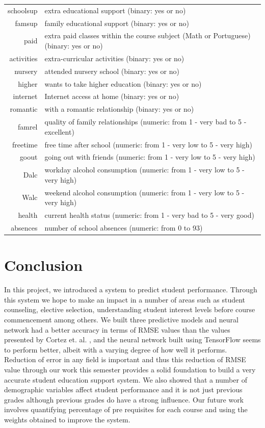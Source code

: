 \documentclass[conference]{IEEEtran}
\begin{document}
\begin{table}[!t]
\begin{tabular}{|r | l|}
schoolsup & extra educational support (binary: yes or no)\\
famsup & family educational support (binary: yes or no)\\
paid & extra paid classes within the course subject (Math or Portuguese) (binary: yes or no)\\
activities & extra-curricular activities (binary: yes or no)\\
nursery & attended nursery school (binary: yes or no)\\
higher & wants to take higher education (binary: yes or no)\\
internet & Internet access at home (binary: yes or no)\\
romantic & with a romantic relationship (binary: yes or no)\\
famrel & quality of family relationships (numeric: from 1 - very bad to 5 - excellent)\\
freetime & free time after school (numeric: from 1 - very low to 5 - very high)\\
goout & going out with friends (numeric: from 1 - very low to 5 - very high)\\
Dalc & workday alcohol consumption (numeric: from 1 - very low to 5 - very high)\\
Walc & weekend alcohol consumption (numeric: from 1 - very low to 5 - very high)\\
health & current health status (numeric: from 1 - very bad to 5 - very good)\\
absences & number of school absences (numeric: from 0 to 93)\\
\hline
\end{tabular}
\end{table}

	\section{Conclusion}
In this project, we introduced a system to predict student performance. Through this system we hope to make an impact in a number of areas such as student counseling, elective selection, understanding student interest levels before course commencement among others. We built three predictive models and neural network had a better accuracy in terms of RMSE values than the values presented by Cortez et. al. \cite{ref:4}, and the neural network built using TensorFlow \cite{tensorflow2015-whitepaper} seems to perform better, albeit with a varying degree of how well it performs. Reduction of error in any field is important and thus this reduction of RMSE value through our work this semester provides a solid foundation to build a very accurate student education support system. We also showed that a number of demographic variables affect student performance and it is not just previous grades although previous grades do have a strong influence. Our future work involves quantifying percentage of pre requisites for each course and using the weights obtained to improve the system.
\end{document}
